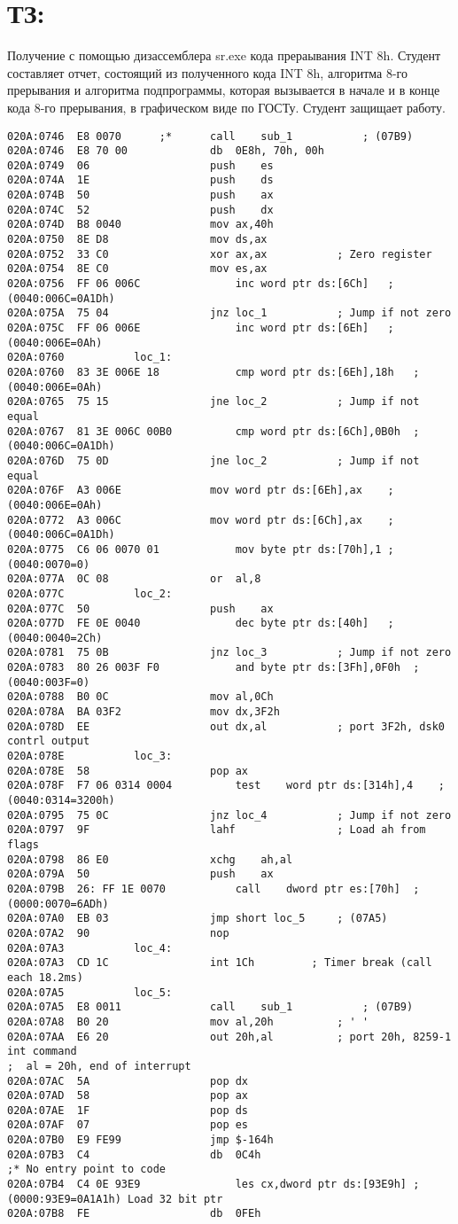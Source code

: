 \section{ТЗ:}
Получение с помощью дизассемблера sr.exe кода прераывания INT 8h. 
Студент составляет отчет, состоящий из полученного кода INT 8h, алгоритма 8-го прерывания и алгоритма подпрограммы, которая вызывается в начале и в конце кода 8-го прерывания, в графическом виде по ГОСТу. Студент защищает работу.

\begin{lstlisting}[label=some-code,caption=Код прераывания INT 8h]
020A:0746  E8 0070		;*		call	sub_1			; (07B9)
020A:0746  E8 70 00				db	0E8h, 70h, 00h
020A:0749  06					push	es
020A:074A  1E					push	ds
020A:074B  50					push	ax
020A:074C  52					push	dx
020A:074D  B8 0040				mov	ax,40h
020A:0750  8E D8				mov	ds,ax
020A:0752  33 C0				xor	ax,ax			; Zero register
020A:0754  8E C0				mov	es,ax
020A:0756  FF 06 006C				inc	word ptr ds:[6Ch]	; (0040:006C=0A1Dh)
020A:075A  75 04				jnz	loc_1			; Jump if not zero
020A:075C  FF 06 006E				inc	word ptr ds:[6Eh]	; (0040:006E=0Ah)
020A:0760			loc_1:
020A:0760  83 3E 006E 18			cmp	word ptr ds:[6Eh],18h	; (0040:006E=0Ah)
020A:0765  75 15				jne	loc_2			; Jump if not equal
020A:0767  81 3E 006C 00B0			cmp	word ptr ds:[6Ch],0B0h	; (0040:006C=0A1Dh)
020A:076D  75 0D				jne	loc_2			; Jump if not equal
020A:076F  A3 006E				mov	word ptr ds:[6Eh],ax	; (0040:006E=0Ah)
020A:0772  A3 006C				mov	word ptr ds:[6Ch],ax	; (0040:006C=0A1Dh)
020A:0775  C6 06 0070 01			mov	byte ptr ds:[70h],1	; (0040:0070=0)
020A:077A  0C 08				or	al,8
020A:077C			loc_2:
020A:077C  50					push	ax
020A:077D  FE 0E 0040				dec	byte ptr ds:[40h]	; (0040:0040=2Ch)
020A:0781  75 0B				jnz	loc_3			; Jump if not zero
020A:0783  80 26 003F F0			and	byte ptr ds:[3Fh],0F0h	; (0040:003F=0)
020A:0788  B0 0C				mov	al,0Ch
020A:078A  BA 03F2				mov	dx,3F2h
020A:078D  EE					out	dx,al			; port 3F2h, dsk0 contrl output
020A:078E			loc_3:
020A:078E  58					pop	ax
020A:078F  F7 06 0314 0004			test	word ptr ds:[314h],4	; (0040:0314=3200h)
020A:0795  75 0C				jnz	loc_4			; Jump if not zero
020A:0797  9F					lahf				; Load ah from flags
020A:0798  86 E0				xchg	ah,al
020A:079A  50					push	ax
020A:079B  26: FF 1E 0070			call	dword ptr es:[70h]	; (0000:0070=6ADh)
020A:07A0  EB 03				jmp	short loc_5		; (07A5)
020A:07A2  90					nop
020A:07A3			loc_4:
020A:07A3  CD 1C				int	1Ch			; Timer break (call each 18.2ms)
020A:07A5			loc_5:
020A:07A5  E8 0011				call	sub_1			; (07B9)
020A:07A8  B0 20				mov	al,20h			; ' '
020A:07AA  E6 20				out	20h,al			; port 20h, 8259-1 int command
;  al = 20h, end of interrupt
020A:07AC  5A					pop	dx
020A:07AD  58					pop	ax
020A:07AE  1F					pop	ds
020A:07AF  07					pop	es
020A:07B0  E9 FE99				jmp	$-164h
020A:07B3  C4					db	0C4h
;* No entry point to code
020A:07B4  C4 0E 93E9				les	cx,dword ptr ds:[93E9h]	; (0000:93E9=0A1A1h) Load 32 bit ptr
020A:07B8  FE					db	0FEh


\end{lstlisting}
